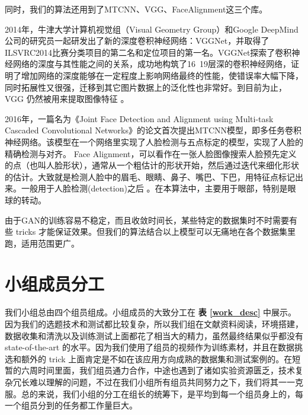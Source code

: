 同时，我们的算法还用到了MTCNN、VGG、FaceAlignment这三个库。

2014年，牛津大学计算机视觉组（Visual Geometry Group）和Google DeepMind公司的研究员一起研发出了新的深度卷积神经网络：VGGNet，并取得了ILSVRC2014比赛分类项目的第二名和定位项目的第一名。VGGNet探索了卷积神经网络的深度与其性能之间的关系，成功地构筑了16~19层深的卷积神经网络，证明了增加网络的深度能够在一定程度上影响网络最终的性能，使错误率大幅下降，同时拓展性又很强，迁移到其它图片数据上的泛化性也非常好。到目前为止，VGG 仍然被用来提取图像特征 \cite{cite_9}。

2016年，一篇名为《Joint Face Detection and Alignment using Multi-task Cascaded Convolutional Networks》\cite{cite_10}的论文首次提出MTCNN模型，即多任务卷积神经网络。该模型在一个网络里实现了人脸检测与五点标定的模型，实现了人脸的精确检测与对齐。
Face Alignment，可以看作在一张人脸图像搜索人脸预先定义的点（也叫人脸形状），通常从一个粗估计的形状开始，然后通过迭代来细化形状的估计。大致就是检测人脸中的眉毛、眼睛、鼻子、嘴巴、下巴，用特征点标记出来。一般用于人脸检测(detection)之后 \cite{cite_11}。在本算法中，主要用于眼部，特别是眼球的转动。

由于GAN的训练容易不稳定，而且收敛时间长，某些特定的数据集时不时需要有些 tricks 才能保证效果。但我们的算法结合以上模型可以无痛地在各个数据集里跑，适用范围更广。


\chapter{小组成员分工}
\label{work}
我们小组总由四个组员组成。小组成员的大致分工在 \textbf{表 \ref{work_desc}} 中展示。因为我们的选题技术和测试都比较复杂，所以我们组在文献资料阅读，环境搭建，数据收集和清洗以及训练测试上面都花了相当大的精力，虽然最终结果似乎都没有 state-of-the-art 的水平。因为我们使用了组员的视频作为训练素材，并且在数据挑选和额外的 trick 上面肯定是不如在该应用方向成熟的数据集和测试案例的。在短暂的六周时间里面，我们组员通力合作，中途也遇到了诸如实验资源匮乏，技术复杂冗长难以理解的问题，不过在我们小组所有组员共同努力之下，我们将其一一克服。总的来说，我们小组的分工在组长的统筹下，是平均到每一个组员身上的，每一个组员分到的任务都工作量巨大。

